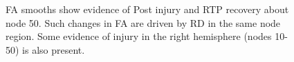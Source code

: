 \documentclass[12pt]{article}
\begin{document}
\begin{figure}[H]
	\centering
	\caption{FA smooths show evidence of Post injury and RTP recovery about node 50. Such changes in FA are driven by RD in the same node region. Some evidence of injury in the right hemisphere (nodes 10-50) is also present.}
	\label{supp-fig:lgio-gam-recov}
\end{figure}
\end{document}
